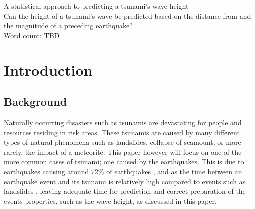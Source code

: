 \documentclass[11pt,letterpaper]{article}
\begin{document}
\doublespacing %



\begin{titlepage}
    \begin{center}
    \vspace*{4cm}
    A statistical approach to predicting a tsunami’s wave height \\
    \vspace{1cm}
    Can the height of a tsunami's wave be predicted based on the distance from and 
    the magnitude of a preceding earthquake? \\
    \vspace{4cm}
    Word count: TBD
    \vfill
    \vspace{0.1cm}
    \end{center}
    \end{titlepage}



\begin{center}
\tableofcontents
\vspace{1in}

\end{center}



\newpage


\section{Introduction}

\subsection{Background}

Naturally occurring disasters such as tsunamis are devastating for 
people and resources residing in risk areas. These tsunamis are caused 
by many different types of natural phenomena such as landslides, collapse of 
seamount, or more rarely, the impact of a meteorite. This paper however will focus 
on one of the more common cases of tsunami; one caused by the earthquakes. This 
is due to earthquakes causing around 72\% of earthquakes \cite{pacifictsunamimuseum}, and as the time between an 
earthquake event and its tsunami is relatively high compared to events such as landslides \cite{sue_nokes_walters}, 
leaving adequate time for prediction and correct preparation of the events properties, such as 
the wave height, as discussed in this paper. 
\end{document}
